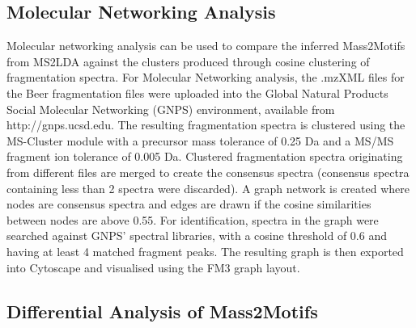 \subsection{Molecular Networking Analysis}

Molecular networking analysis can be used to compare the inferred Mass2Motifs from MS2LDA against the clusters produced through cosine clustering of fragmentation spectra. For Molecular Networking analysis, the .mzXML files for the Beer fragmentation files were uploaded into the Global Natural Products Social Molecular Networking (GNPS) environment, available from http://gnps.ucsd.edu. The resulting fragmentation spectra is clustered using the MS-Cluster module with a precursor mass tolerance of 0.25 Da and a MS/MS fragment ion tolerance of 0.005 Da. Clustered fragmentation spectra originating from different files are merged to create the consensus spectra (consensus spectra containing less than 2 spectra were discarded). A graph network is created where nodes are consensus spectra and edges are drawn if the cosine similarities between nodes are above 0.55. For identification, spectra in the graph were searched against GNPS' spectral libraries, with a cosine threshold of 0.6 and having at least 4 matched fragment peaks. The resulting graph is then exported into Cytoscape and visualised using the FM3 graph layout. 

\subsection{Differential Analysis of Mass2Motifs}

